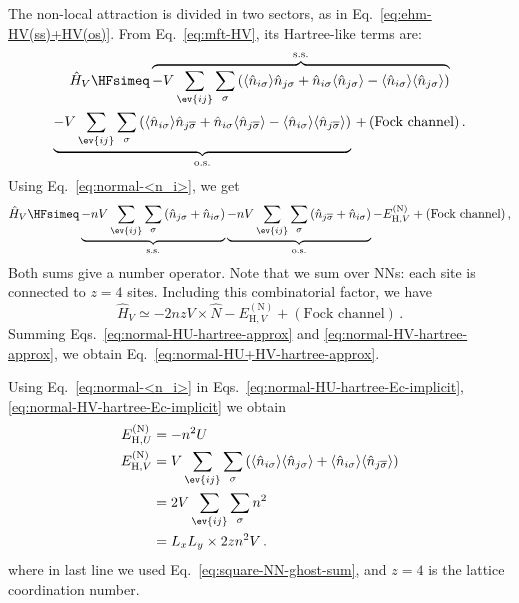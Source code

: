 \begin{tabproof}
	The non-local attraction is divided in two sectors, as in Eq.~\eqref{eq:ehm-HV(ss)+HV(os)}. From Eq.~\eqref{eq:mft-HV}, its Hartree-like terms are:
	\begin{multline}
		\hat H_V \HFsimeq 
		\overbrace{
			-V \sum_{\ev{ij}} \sum_\sigma \left(
				\langle 
				\hat n_{i\sigma}
				\rangle \hat n_{j\sigma} + \hat n_{i\sigma} \langle 
				\hat n_{j\sigma}
				\rangle - \langle 
				\hat n_{i\sigma}
				\rangle \langle 
				\hat n_{j\sigma}
				\rangle
			\right)
		}^{\mathrm{s.s.}} \\
		\underbrace{
			-V \sum_{\ev{ij}} \sum_\sigma \left(
				\langle
				\hat n_{i\sigma}
				\rangle \hat n_{j\overline{\sigma}} + \hat n_{i\sigma} \langle 
				\hat n_{j\overline{\sigma}}
				\rangle
				- \langle 
				\hat n_{i\sigma}
				\rangle \langle 
				\hat n_{j\overline{\sigma}}
				\rangle
			\right)
		}_{\mathrm{o.s.}} \, +\, 
		(\text{Fock channel}) \, . \label{eq:normal-hartree-HV}
	\end{multline}
	Using Eq.~\eqref{eq:normal-<n_i>}, we get
	\begin{equation}\label{eq:normal-hartree-HV-int1}
		\hat H_V \HFsimeq  \underbrace{
			-nV \sum_{\ev{ij}} \sum_\sigma \left(
			\hat n_{j\sigma} + \hat n_{i\sigma}
			\right)
		}_{\mathrm{s.s.}}
		\underbrace{
			-nV \sum_{\ev{ij}} \sum_\sigma \left(
			\hat n_{j\overline{\sigma}} + \hat n_{i\sigma}
			\right)
		}_{\mathrm{o.s.}} 
		- E_{\mathrm{H},V}^{(\mathrm{N})}
		+ (\text{Fock channel}) \, ,
	\end{equation}
	Both sums give a number operator. Note that we sum over NNs: each site is connected to $z=4$ sites. Including this combinatorial factor, we have
	\begin{equation}\label{eq:normal-HV-hartree-approx}
		\hat H_V \simeq -2nzV \times \hat N - E_{\mathrm{H},V}^{(\mathrm{N})} + 
		(\text{Fock channel}) \, .
	\end{equation}
	Summing Eqs.~\eqref{eq:normal-HU-hartree-approx} and \eqref{eq:normal-HV-hartree-approx}, we obtain Eq.~\eqref{eq:normal-HU+HV-hartree-approx}.
	
\end{tabproof}

Using Eq.~\eqref{eq:normal-<n_i>} in Eqs.~\eqref{eq:normal-HU-hartree-Ec-implicit}, \eqref{eq:normal-HV-hartree-Ec-implicit} we obtain
\begin{align}
	E_{\mathrm{H},U}^{(\mathrm{N})} &= -n^2 U \label{eq:normal-HU-hartree-Ec} \\
	E_{\mathrm{H},V}^{(\mathrm{N})} &= V \sum_{\ev{ij}} \sum_\sigma \left(
	\langle 
	\hat n_{i\sigma}
	\rangle \langle 
	\hat n_{j\sigma}
	\rangle
	+
	\langle 
	\hat n_{i\sigma}
	\rangle \langle 
	\hat n_{j\overline{\sigma}}
	\rangle
	\right) \nonumber \\
	&= 2V \sum_{\ev{ij}} \sum_\sigma n^2 \nonumber \\
	&= L_x L_y \times 2zn^2 V \, . \label{eq:normal-HV-hartree-Ec}
\end{align}
where in last line we used Eq.~\eqref{eq:square-NN-ghost-sum}, and $z=4$ is the lattice coordination number.

